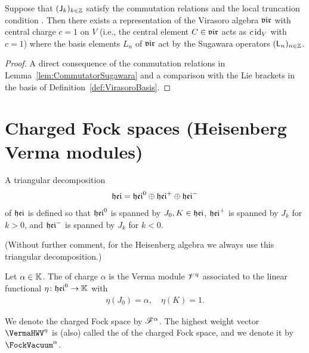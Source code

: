 \begin{theorem}
  \label{thm:SugawaraRepresentation}
  \leanok
  Suppose that $(\mathsf{J}_{k})_{k \in \mathbb{Z}}$ satisfy the commutation relations
  \tagHeiComm{} and the local truncation condition
  \tagHeiTrunc{}. Then there exists a representation of the Virasoro algebra $\mathfrak{vir}$
  with central charge $c = 1$ on $V$ (i.e.,
  the central element $C \in \mathfrak{vir}$ acts as $c \, \mathrm{id}_V$ with $c = 1$)
  where the basis elements $L_n$ of $\mathfrak{vir}$ act by
  the Sugawara operators $(\mathsf{L}_n)_{n \in \mathbb{Z}}$.
\end{theorem}
\begin{proof}
  \leanok
  A direct consequence of the commutation relations in Lemma~\ref{lem:CommutatorSugawara}
  and a comparison with the Lie brackets in the basis of Definition~\ref{def:VirasoroBasis}.
\end{proof}


\section{Charged Fock spaces (Heisenberg Verma modules)}

\begin{definition}
  \label{def:HeisenbergTriangular}
  \leanok
  A triangular decomposition
  \begin{align*}
    \mathfrak{hei} = \mathfrak{hei}^0 \oplus \mathfrak{hei}^+ \oplus \mathfrak{hei}^-
  \end{align*}
  of $\mathfrak{hei}$ is defined so that $\mathfrak{hei}^0$ is spanned by $J_0, K \in \mathfrak{hei}$,
  $\mathfrak{hei}^+$ is spanned by $J_k$ for $k > 0$,
  and $\mathfrak{hei}^-$ is spanned by $J_k$ for $k < 0$.

  (Without further comment, for the Heisenberg algebra we always use this
  triangular decomposition.)
\end{definition}

\begin{definition}
  \label{def:ChargedFockSpace}
  \leanok
  Let $\alpha \in \mathbb{K}$.
  The  of charge $\alpha$
  is the Verma module $\mathscr{V}^{\eta}$ associated to the linear functional
  $\eta \colon \mathfrak{hei}^0 \to \mathbb{K}$ with
  \begin{align*}
    \eta(J_0) = \alpha, \quad \eta(K) = 1 .
  \end{align*}

  We denote the charged Fock space by $\mathscr{F}^{\alpha}$.
  The highest weight vector $\VermaHWV^{\eta}$
  is (also) called the  of the charged Fock space,
  and we denote it by $\FockVacuum^{\alpha}$.
\end{definition}


